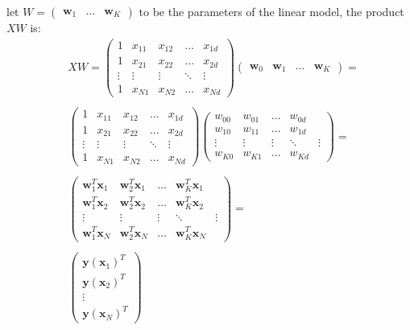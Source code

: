 \documentclass[10pt, letterpaper]{report}
\begin{document}
let $W=\begin{pmatrix}
        \mathbf w_1& \dots& \mathbf w_K
    \end{pmatrix}$ to be the parameters of the linear model, the product $XW$ is: \begin{align}
   &XW = \begin{pmatrix}
        1&x_{11}&x_{12}&\dots &x_{1d}\\ 
        1&x_{21}&x_{22}&\dots &x_{2d}\\ 
        \vdots &\vdots & \vdots &\ddots & \vdots\\ 
        1&x_{N1}&x_{N2}&\dots &x_{Nd}
    \end{pmatrix}\begin{pmatrix}
        \mathbf w_0&\mathbf w_1&\dots & \mathbf w_K
    \end{pmatrix}=\\ \\
    &\begin{pmatrix}
        1&x_{11}&x_{12}&\dots &x_{1d}\\ 
        1&x_{21}&x_{22}&\dots &x_{2d}\\ 
        \vdots &\vdots & \vdots &\ddots & \vdots\\ 
        1&x_{N1}&x_{N2}&\dots &x_{Nd}
    \end{pmatrix}
    \begin{pmatrix}
        w_{00} & w_{01} & \dots & w_{0d}\\
        w_{10} & w_{11} & \dots & w_{1d}\\
        \vdots &\vdots & \vdots &\ddots & \vdots\\ 
        w_{K0} & w_{K1} & \dots & w_{Kd}
    \end{pmatrix}=\\  \\
    &\begin{pmatrix}
        \mathbf w^T_1\mathbf x_1 &\mathbf w^T_2\mathbf x_1 &\dots & \mathbf w^T_K\mathbf x_1\\ 
        \mathbf w^T_1\mathbf x_2 &\mathbf w^T_2\mathbf x_2 &\dots & \mathbf w^T_K\mathbf x_2\\
        \vdots &\vdots & \vdots &\ddots & \vdots\\
        \mathbf w^T_1\mathbf x_N &\mathbf w^T_2\mathbf x_N  &\dots & \mathbf w^T_K\mathbf x_N 
    \end{pmatrix} =\\ \\ &\begin{pmatrix}
        \mathbf y(\mathbf x_1)^T\\ 
        \mathbf y(\mathbf x_2)^T\\ 
        \vdots \\ 
        \mathbf y(\mathbf x_N)^T
    \end{pmatrix}
\end{align}
\end{document}
